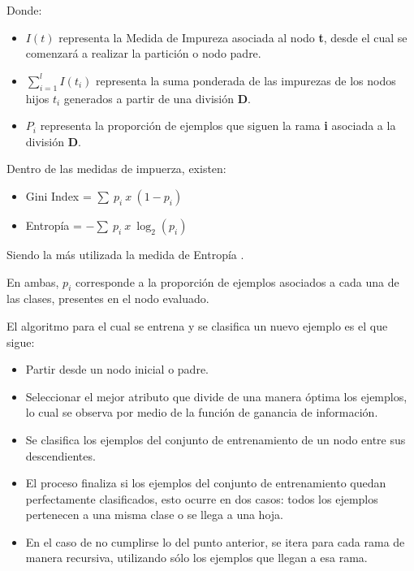 Donde: 

\begin{itemize}
	\item $I(t)$ representa la Medida de Impureza asociada al nodo \textbf{t}, desde el cual se comenzará a realizar la partición o nodo padre.
	
	\item $\sum_{i=1}^{l} I(t_{i})$ representa la suma ponderada de las impurezas de los nodos hijos \textbf{$t_{i}$} generados a partir de una división \textbf{D}.
	
	\item $P_{i}$ representa la proporción de ejemplos que siguen la rama \textbf{i} asociada a la división \textbf{D}.
\end{itemize}

Dentro de las medidas de impuerza, existen:

\begin{itemize}
	\item Gini Index = $\sum\ p_{i}\ x\ (1-p_{i})$
	\item Entropía = $-\sum\ p_{i}\ x\ \log_{2}(p_{i})$
\end{itemize}

Siendo la más utilizada la medida de Entropía \cite{friedman2001elements}. 

En ambas, $p_i$ corresponde a la proporción de ejemplos asociados a cada una de las clases, presentes en el nodo evaluado.

El algoritmo para el cual se entrena y se clasifica un nuevo ejemplo es el que sigue:

\begin{itemize}
	
	\item Partir desde un nodo inicial o padre.
	\item Seleccionar el mejor atributo que divide de una manera óptima los ejemplos, lo cual se observa por medio de la función de ganancia de información.
	\item Se clasifica los ejemplos del conjunto de entrenamiento de un nodo entre sus descendientes.
	\item El proceso finaliza si los ejemplos del conjunto de entrenamiento quedan perfectamente clasificados, esto ocurre en dos casos: todos los ejemplos pertenecen a una misma clase o se llega a una hoja.
	\item En el caso de no cumplirse lo del punto anterior, se itera para cada rama de manera recursiva, utilizando sólo los ejemplos que llegan a esa rama.
	
\end{itemize}

